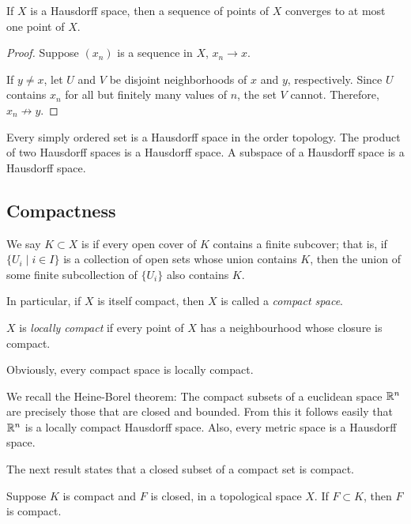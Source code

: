 \begin{lemma}
If $X$ is a Hausdorff space, then a sequence of points of $X$ converges to at most one point of $X$.
\end{lemma}

\begin{proof}
Suppose $(x_n)$ is a sequence in $X$, $x_n\to x$. 

If $y\neq x$, let $U$ and $V$ be disjoint neighborhoods of $x$ and $y$, respectively. Since $U$ contains $x_n$ for all but finitely many values of $n$, the set $V$ cannot. Therefore, $x_n\not\to y$.
\end{proof}

\begin{proposition}
Every simply ordered set is a Hausdorff space in the order topology. The product of two Hausdorff spaces is a Hausdorff space. A subspace of a Hausdorff space is a Hausdorff space.
\end{proposition}
\pagebreak

\subsection{Compactness}
\begin{definition}
We say $K\subset X$ is  if every open cover of $K$ contains a finite subcover; that is, if $\{U_i\mid i\in I\}$ is a collection of open sets whose union contains $K$, then the union of some finite subcollection of $\{U_i\}$ also contains $K$.

In particular, if $X$ is itself compact, then $X$ is called a \emph{compact space}. 

$X$ is \emph{locally compact} if every point of $X$ has a neighbourhood whose closure is compact.
\end{definition}

Obviously, every compact space is locally compact.

We recall the Heine-Borel theorem: The compact subsets of a euclidean space $\mathbb R^n$ are precisely those that are closed and bounded. From this it follows easily that $\mathbb R^n$ is a locally compact Hausdorff space. Also, every metric space is a Hausdorff space.

The next result states that a closed subset of a compact set is compact.

\begin{lemma}
Suppose $K$ is compact and $F$ is closed, in a topological space $X$. If $F\subset K$, then $F$ is compact.
\end{lemma}

